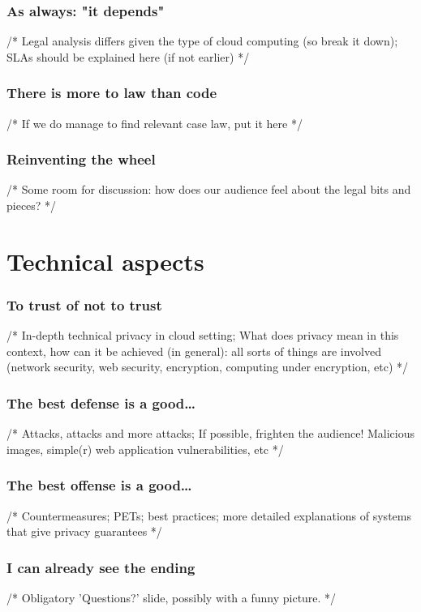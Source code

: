 \documentclass{beamer}
\begin{document}
\begin{frame}
    \frametitle{As always: "it depends"}
    /* Legal analysis differs given the type of cloud computing (so break it
    down); SLAs should be explained here (if not earlier) */
\end{frame}

\begin{frame}
    \frametitle{There is more to law than code}
    /* If we do manage to find relevant case law, put it here */
\end{frame}

\begin{frame}
    \frametitle{Reinventing the wheel}
    /* Some room for discussion: how does our audience feel about the legal
    bits and pieces? */
\end{frame}

\section{Technical aspects}

\begin{frame}
    \frametitle{To trust of not to trust}
    /* In-depth technical privacy in cloud setting; What does privacy mean in
    this context, how can it be achieved (in general): all sorts of things are involved
    (network security, web security, encryption, computing under encryption,
    etc) */
\end{frame}

\begin{frame}
    \frametitle{The best defense is a good\dots}
    /* Attacks, attacks and more attacks; If possible, frighten the audience!
    Malicious images, simple(r) web application vulnerabilities, etc */
\end{frame}

\begin{frame}
    \frametitle{The best offense is a good\dots}
    /* Countermeasures; PETs; best practices; more detailed explanations of
    systems that give privacy guarantees */
\end{frame}

\begin{frame}
    \frametitle{I can already see the ending}
    /* Obligatory 'Questions?' slide, possibly with a funny picture. */
\end{frame}
\end{document}
